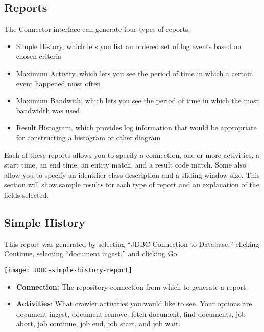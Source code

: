 \begin{changemargin}{1.5in}{0in}

\section{Reports}

The Connector interface can generate four types of reports:

\begin{itemize}

\item Simple History, which lets you list an ordered set of log events
based on chosen criteria

\item Maximum Activity, which lets you see the period of time in
which a certain event happened most often

\item Maximum Bandwith, which lets you see the period of time in
which the most bandwidth was used 

\item Result Histogram, which provides log information that would be
appropriate for constructing a histogram or other diagram

\end{itemize}

Each of these reports allows you to specify a connection, one or more
activities, a start time, an end time, an entity match, and a result code
match.  Some also allow you to specify an identifier class description
and a sliding window size. This section will show sample results for
each type of report and an explanation of the fields selected.

\subsection{Simple History}

This report was generated by selecting ``JDBC Connection to Database,'' 
clicking Continue, selecting ``document ingest,'' and clicking Go.

\texttt{[image: JDBC-simple-history-report]}

\begin{itemize}

\item \textbf{Connection:} The repository connection from which to generate
a report.

\item \textbf{Activities}: What crawler activities you would like to see. 
Your options are document ingest, document remove, fetch document, find 
documents, job abort, job continue, job end, job start, and job wait. 


\end{itemize}
\end{changemargin}
